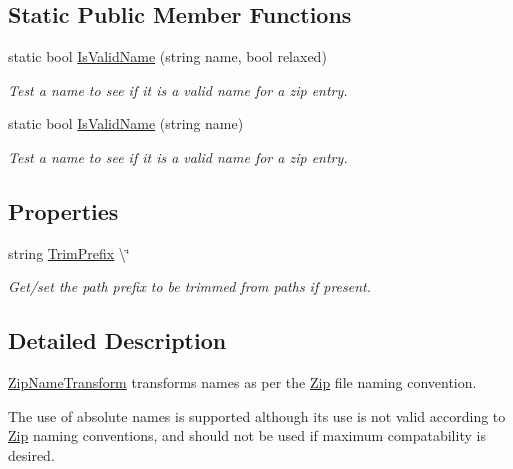 \subsection*{Static Public Member Functions}
\begin{DoxyCompactItemize}
\item 
static bool \hyperlink{class_i_c_sharp_code_1_1_sharp_zip_lib_1_1_zip_1_1_zip_name_transform_af81c92be4ef74892e7098d0645eb28fb}{Is\+Valid\+Name} (string name, bool relaxed)
\begin{DoxyCompactList}\small\item\em Test a name to see if it is a valid name for a zip entry. \end{DoxyCompactList}\item 
static bool \hyperlink{class_i_c_sharp_code_1_1_sharp_zip_lib_1_1_zip_1_1_zip_name_transform_abff0f26baee3573886aa606a79c31d48}{Is\+Valid\+Name} (string name)
\begin{DoxyCompactList}\small\item\em Test a name to see if it is a valid name for a zip entry. \end{DoxyCompactList}\end{DoxyCompactItemize}
\subsection*{Properties}
\begin{DoxyCompactItemize}
\item 
string \hyperlink{class_i_c_sharp_code_1_1_sharp_zip_lib_1_1_zip_1_1_zip_name_transform_a77825f4a91d6c3ce551dca55eeb3b3eb}{Trim\+Prefix} \textbackslash{}\char`\"{}
\begin{DoxyCompactList}\small\item\em Get/set the path prefix to be trimmed from paths if present. \end{DoxyCompactList}\end{DoxyCompactItemize}


\subsection{Detailed Description}
\hyperlink{class_i_c_sharp_code_1_1_sharp_zip_lib_1_1_zip_1_1_zip_name_transform}{Zip\+Name\+Transform} transforms names as per the \hyperlink{namespace_i_c_sharp_code_1_1_sharp_zip_lib_1_1_zip}{Zip} file naming convention. 

The use of absolute names is supported although its use is not valid according to \hyperlink{namespace_i_c_sharp_code_1_1_sharp_zip_lib_1_1_zip}{Zip} naming conventions, and should not be used if maximum compatability is desired.

